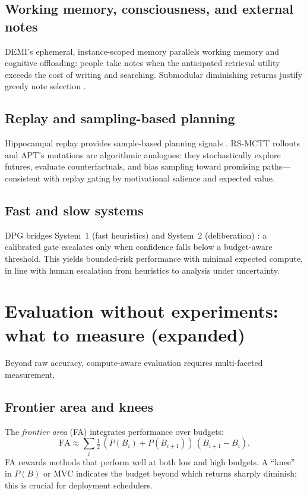 \subsection{Working memory, consciousness, and external notes}
DEMI’s ephemeral, instance-scoped memory parallels working memory and cognitive offloading: people take notes when the anticipated retrieval utility exceeds the cost of writing and searching. Submodular diminishing returns justify greedy note selection \cite{baddeley1992workingmemory,dehaene2011gnw,sviridenko2004}.

\subsection{Replay and sampling-based planning}
Hippocampal replay provides sample-based planning signals \cite{pfeifferfoster2013}. RS-MCTT rollouts and APT’s mutations are algorithmic analogues: they stochastically explore futures, evaluate counterfactuals, and bias sampling toward promising paths—consistent with replay gating by motivational salience and expected value.

\subsection{Fast and slow systems}
DPG bridges System~1 (fast heuristics) and System~2 (deliberation) \cite{kahneman2011,botvinick2019rlfastslow}: a calibrated gate escalates only when confidence falls below a budget-aware threshold. This yields bounded-risk performance with minimal expected compute, in line with human escalation from heuristics to analysis under uncertainty.

\section{Evaluation without experiments: what to measure (expanded)}

Beyond raw accuracy, compute-aware evaluation requires multi-faceted measurement.

\subsection{Frontier area and knees}
The \emph{frontier area} (FA) integrates performance over budgets:
\begin{equation}
\mathrm{FA} \approx \sum_{i} \tfrac{1}{2}\,(P(B_i)+P(B_{i+1}))\,(B_{i+1}-B_i).
\end{equation}
FA rewards methods that perform well at both low and high budgets. A “knee” in $P(B)$ or MVC indicates the budget beyond which returns sharply diminish; this is crucial for deployment schedulers.

